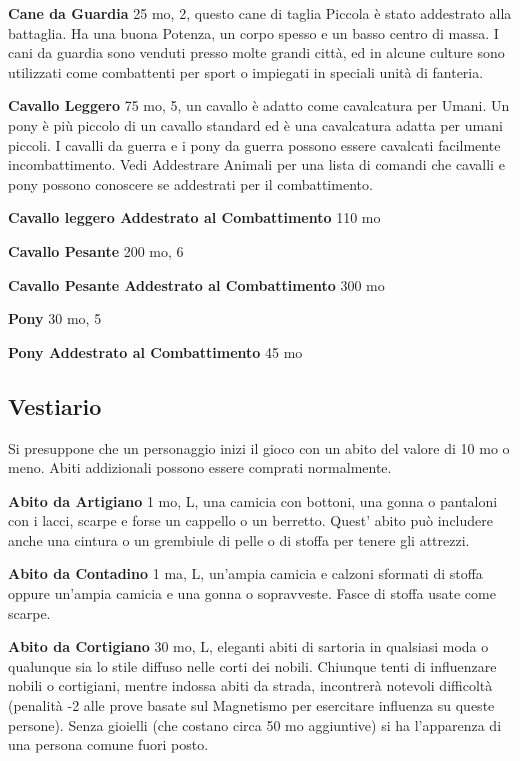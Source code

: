 \documentclass[a4paper,11pt,twoside,openany]{book}
\begin{document}
\textbf{Cane da Guardia} 25 mo, 2, questo cane di taglia Piccola è stato addestrato alla battaglia. Ha una buona Potenza, un corpo spesso e un basso centro di massa. I cani da guardia sono venduti presso molte grandi città, ed in alcune culture sono utilizzati come combattenti per sport o impiegati in speciali unità di fanteria.

\textbf{Cavallo Leggero} 75 mo, 5, un cavallo è adatto come cavalcatura per Umani. Un pony è più piccolo di un cavallo standard ed è una cavalcatura adatta per umani piccoli. I cavalli da guerra e i pony da guerra possono essere cavalcati facilmente incombattimento.
Vedi Addestrare Animali per una lista di comandi che cavalli e pony possono conoscere se addestrati per il combattimento.

\textbf{Cavallo leggero Addestrato al Combattimento} 110 mo

\textbf{Cavallo Pesante} 200 mo, 6

\textbf{Cavallo Pesante Addestrato al Combattimento} 300 mo

\textbf{Pony} 30 mo, 5

\textbf{Pony Addestrato al Combattimento} 45 mo

\pagebreak

\subsection{Vestiario}

\label{vestiario}

Si presuppone che un personaggio inizi il gioco con un abito del valore di 10 mo o meno. Abiti addizionali possono essere comprati normalmente.

\textbf{Abito da Artigiano} 1 mo, L, una camicia con bottoni, una gonna o pantaloni con i lacci, scarpe e forse un cappello o un berretto. Quest' abito può includere anche una cintura o un grembiule di pelle o di stoffa per tenere gli attrezzi.

\textbf{Abito da Contadino} 1 ma, L, un'ampia camicia e calzoni sformati di stoffa oppure un'ampia camicia e una gonna o sopravveste. Fasce di stoffa usate come scarpe.

\textbf{Abito da Cortigiano} 30 mo, L, eleganti abiti di sartoria in qualsiasi moda o qualunque sia lo stile diffuso nelle corti dei nobili. Chiunque tenti di influenzare nobili o cortigiani, mentre indossa abiti da strada, incontrerà notevoli difficoltà (penalità -2 alle prove basate sul Magnetismo per esercitare influenza su queste persone). Senza gioielli (che costano circa 50 mo aggiuntive) si ha l'apparenza di una persona comune fuori posto.
\end{document}
